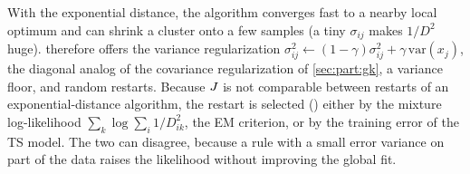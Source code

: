 With the exponential distance, the algorithm converges fast to a nearby local optimum and can shrink a cluster onto a few samples (a tiny $\sigma_{ij}$ makes $1/D^2$ huge).  therefore offers the variance regularization $\sigma^2_{ij}\leftarrow(1-\gamma)\sigma^2_{ij}+\gamma\,\mathrm{var}(x_j)$, the diagonal analog of the covariance regularization of \cref{sec:part:gk}, a variance floor, and random restarts. Because $J$ is not comparable between restarts of an exponential-distance algorithm, the restart is selected () either by the mixture log-likelihood $\sum_k\log\sum_i 1/D^2_{ik}$, the EM criterion, or by the training error of the TS model. The two can disagree, because a rule with a small error variance on part of the data raises the likelihood without improving the global fit.


